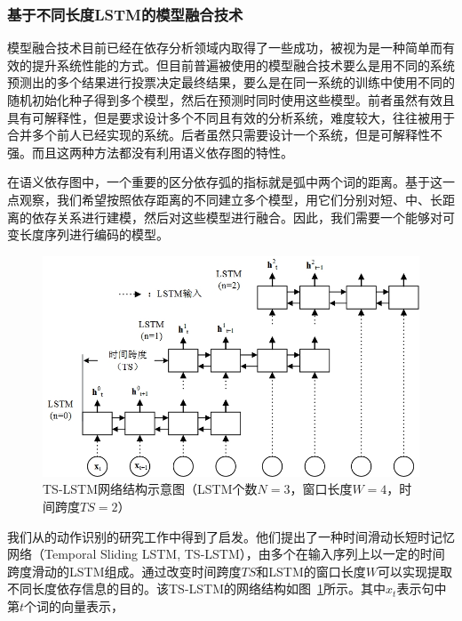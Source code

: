 \subsubsection{基于不同长度LSTM的模型融合技术}

模型融合技术目前已经在依存分析领域内取得了一些成功，被视为是一种简单而有效的提升系统性能的方式。但目前普遍被使用的模型融合技术要么是用不同的系统预测出的多个结果进行投票决定最终结果，要么是在同一系统的训练中使用不同的随机初始化种子得到多个模型，然后在预测时同时使用这些模型。前者虽然有效且具有可解释性，但是要求设计多个不同且有效的分析系统，难度较大，往往被用于合并多个前人已经实现的系统。后者虽然只需要设计一个系统，但是可解释性不强。而且这两种方法都没有利用语义依存图的特性。

在语义依存图中，一个重要的区分依存弧的指标就是弧中两个词的距离。基于这一点观察，我们希望按照依存距离的不同建立多个模型，用它们分别对短、中、长距离的依存关系进行建模，然后对这些模型进行融合。因此，我们需要一个能够对可变长度序列进行编码的模型。

\begin{figure}[hbtp]
	\centering
	\includegraphics[width=130mm]{picture/ts-lstm.jpg}
	\caption{TS-LSTM网络结构示意图（LSTM个数$N=3$，窗口长度$W=4$，时间跨度$TS=2$）}
	\label{fig:ts-lstm}
\end{figure}

我们从的动作识别的研究工作中得到了启发。他们提出了一种时间滑动长短时记忆网络（Temporal Sliding LSTM, TS-LSTM），由多个在输入序列上以一定的时间跨度滑动的LSTM组成。通过改变时间跨度$TS$和LSTM的窗口长度$W$可以实现提取不同长度依存信息的目的。该TS-LSTM的网络结构如图~\ref{fig:ts-lstm}所示。其中$x_t$表示句中第$t$个词的向量表示，


